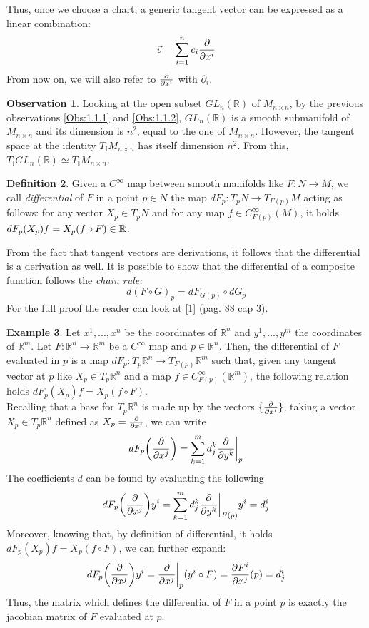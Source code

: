 \documentclass[12pt,a4paper]{report}
\theoremstyle{definition}
\newtheorem{Def}{Definition}[chapter]
\theoremstyle{Theorem}
\theoremstyle{definition}
\newtheorem{Ex}[Def]{Example}
\theoremstyle{definition}
\newtheorem{Obs}[Def]{Observation}
\begin{document}
	Thus, once we choose a chart, a generic tangent vector can be expressed as a linear combination: $$\vec{v}=\sum_{i=1}^{n}c_i{\partial\over \partial x^i}$$ 
	From now on, we will also refer to $\partial\over \partial x^i$ with $\partial_i$.
	\begin{Obs} \label{Obs 1.1.3}
		Looking at the open subset $GL_n(\mathbb{R})$ of $M_{n\times n}$, by the previous observations \ref{Obs:1.1.1} and \ref{Obs:1.1.2}, $GL_n(\mathbb{R})$ is a smooth submanifold of $M_{n\times n}$ and its dimension is $n^2$, equal to the one of $M_{n\times n}$. However, the tangent space at the identity $T_\mathbb{I}M_{n\times n}$ has itself dimension $n^2$. From this, $T_\mathbb{I}GL_n(\mathbb{R})\simeq T_\mathbb{I}M_{n\times n}$.
	\end{Obs}
	\begin{Def}
		Given a $C^\infty$ map between smooth manifolds like $F:N\rightarrow M$, we call \textit{differential} of $F$ in a point $p\in N$ the map $dF_p:T_pN\rightarrow T_{F(p)}M$ acting as follows: for any vector $X_p\in T_pN$ and for any map $f\in C_{F(p)}^\infty(M)$, it holds $dF_p(X_p)f=\\X_p(f\circ F)\in\mathbb{R}$.
	\end{Def}
	From the fact that tangent vectors are derivations, it follows that the differential is a derivation as well. It is possible to show that the differential of a composite function follows the \textit{chain rule:} 
	$$d(F\circ G)_p=dF_{G(p)}\circ dG_p$$ 
	For the full proof the reader can look at [1] (pag. 88 cap 3).
	\begin{Ex}
		Let $x^1,...,x^n$ be the coordinates of $\mathbb{R}^n$ and $y^1,...,y^m$ the coordinates of $\mathbb{R}^m$. Let $F:\mathbb{R}^n\rightarrow \mathbb{R}^m$ be a $C^\infty$ map and $p\in \mathbb{R}^n$. Then, the differential of $F$ evaluated in $p$ is a map $dF_p:T_p\mathbb{R}^n\rightarrow T_{F(p)}\mathbb{R}^m$ such that, given any tangent vector at $p$ like $X_p\in T_p\mathbb{R}^n$ and a map $f\in C_{F(p)}^\infty(\mathbb{R}^m)$, the following relation holds $dF_p(X_p)f=X_p(f\circ F)$.\\
		Recalling that a base for $T_p\mathbb{R}^n$ is made up by the vectors $\{{\partial\over\partial x^i}\}$, taking a vector $X_p\in T_p\mathbb{R}^n$ defined as $X_p={\partial\over \partial x^j}$, we can write $$dF_p\bigg{(}{\partial\over \partial x^j}\bigg{)}=\sum_{k=1}^{m}d_j^k{\partial\over \partial y^k}\bigg{\rvert}_p$$
		The coefficients $d$ can be found by evaluating the following 
		$$dF_p\bigg{(}{\partial\over \partial x^j}\bigg{)}y^i=\sum_{k=1}^{m}d_j^k{\partial\over \partial y^k}\bigg{\rvert}_{F(p)}y^i=d_j^i$$
		Moreover, knowing that, by definition of differential, it holds $dF_p(X_p)f=X_p(f\circ F)$, we can further expand:
		$$dF_p\bigg{(}{\partial\over \partial x^j}\bigg{)}y^i={\partial\over \partial x^j}\bigg{\rvert}_p(y^i\circ F)={\partial F^i\over \partial x^j}(p)=d^i_j$$
		Thus, the matrix which defines the differential of $F$ in a point $p$ is exactly the jacobian matrix of $F$ evaluated at $p$.
	\end{Ex}
\end{document}
